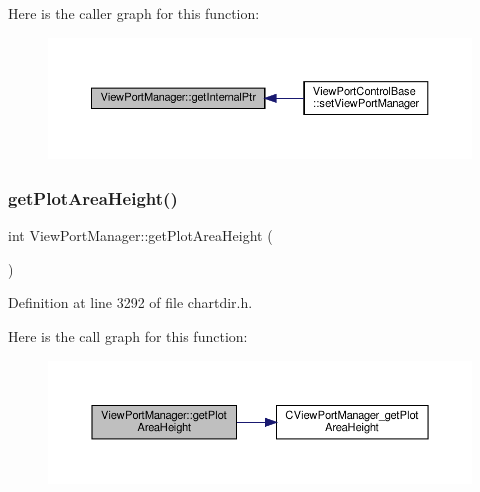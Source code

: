 Here is the caller graph for this function\+:
\nopagebreak
\begin{figure}[H]
\begin{center}
\leavevmode
\includegraphics[width=350pt]{class_view_port_manager_af3aa3a669ee164439737ea284c6c9cdf_icgraph}
\end{center}
\end{figure}
\mbox{\label{class_view_port_manager_a27afd05fac15bcaa4f06eb9bc675a6d0}} 
\subsubsection{\texorpdfstring{get\+Plot\+Area\+Height()}{getPlotAreaHeight()}}
{\footnotesize\ttfamily int View\+Port\+Manager\+::get\+Plot\+Area\+Height (\begin{DoxyParamCaption}{ }\end{DoxyParamCaption})\hspace{0.3cm}{\ttfamily [inline]}}



Definition at line 3292 of file chartdir.\+h.

Here is the call graph for this function\+:
\nopagebreak
\begin{figure}[H]
\begin{center}
\leavevmode
\includegraphics[width=350pt]{class_view_port_manager_a27afd05fac15bcaa4f06eb9bc675a6d0_cgraph}
\end{center}
\end{figure}
\mbox{\label{class_view_port_manager_a244345729e7f3798f509031a72bf7362}} 

